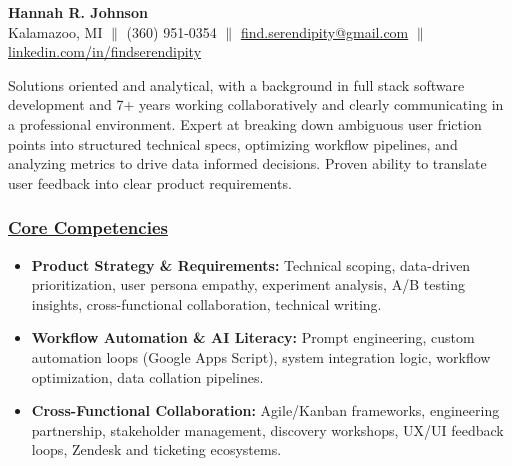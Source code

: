 \documentclass[a4paper,10pt]{article}
\begin{document}
\begin{center}
      {\LARGE \textbf{Hannah R. Johnson}} \\
            Kalamazoo, MI $\parallel$ (360) 951-0354 $\parallel$ \href{mailto:find.serendipity@gmail.com}{find.serendipity@gmail.com} $\parallel$ \href{https://www.linkedin.com/in/findserendipity/}{linkedin.com/in/findserendipity} 
\end{center}

\vspace{2mm}
Solutions oriented and analytical, with a background in full stack software development and 7+ years working collaboratively and clearly communicating in a professional environment. Expert at breaking down ambiguous user friction points into structured technical specs, optimizing workflow pipelines, and analyzing metrics to drive data informed decisions. Proven ability to translate user feedback into clear product requirements.
\vspace{1.5mm}

\subsubsection{\underline{Core Competencies}}
\begin{itemize}
    \item \textbf{Product Strategy \& Requirements:} Technical scoping, data-driven prioritization, user persona empathy, experiment analysis, A/B testing insights, cross-functional collaboration, technical writing.
    \item \textbf{Workflow Automation \& AI Literacy:} Prompt engineering, custom automation loops (Google Apps Script), system integration logic, workflow optimization, data collation pipelines.
    \item \textbf{Cross-Functional Collaboration:} Agile/Kanban frameworks, engineering partnership, stakeholder management, discovery workshops, UX/UI feedback loops, Zendesk and ticketing ecosystems.
\end{itemize}
\end{document}
